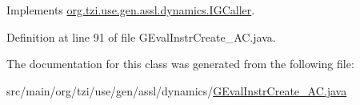 Implements \hyperlink{interfaceorg_1_1tzi_1_1use_1_1gen_1_1assl_1_1dynamics_1_1_i_g_caller_a5d86832a783f44ce72eaacd64e207330}{org.\-tzi.\-use.\-gen.\-assl.\-dynamics.\-I\-G\-Caller}.



Definition at line 91 of file G\-Eval\-Instr\-Create\-\_\-\-A\-C.\-java.



The documentation for this class was generated from the following file\-:\begin{DoxyCompactItemize}
\item 
src/main/org/tzi/use/gen/assl/dynamics/\hyperlink{_g_eval_instr_create___a_c_8java}{G\-Eval\-Instr\-Create\-\_\-\-A\-C.\-java}\end{DoxyCompactItemize}

